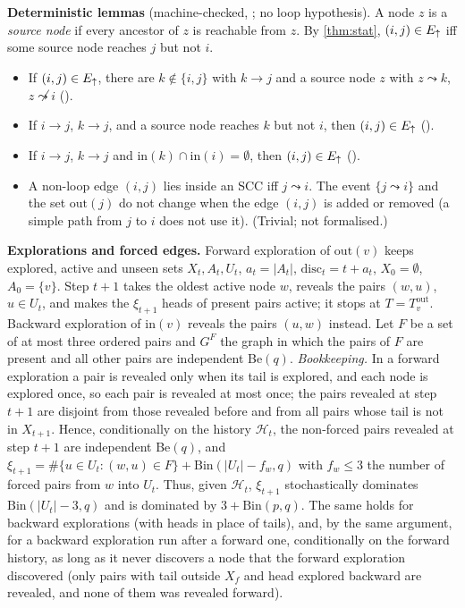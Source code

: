 \textbf{Deterministic lemmas} (machine-checked, ; no loop
hypothesis). A node $z$ is a \emph{source node} if every ancestor of $z$ is
reachable from $z$. By \cref{thm:stat}, $(i,j)\in E_{\uparrow}$ iff some source node
reaches $j$ but not $i$.
\begin{itemize}
\item[(W1)] If $(i,j)\in E_{\uparrow}$, there are $k\notin\{i,j\}$ with $k\to j$ and a
source node $z$ with $z\leadsto k$, $z\not\leadsto i$ ().
\item[(W2)] If $i\to j$, $k\to j$, and a source node reaches $k$ but not $i$,
then $(i,j)\in E_{\uparrow}$ ().
\item[(W3)] If $i\to j$, $k\to j$ and $\mathrm{in}(k)\cap\mathrm{in}(i)=\emptyset$,
then $(i,j)\in E_{\uparrow}$ ().
\item[(W5)] A non-loop edge $(i,j)$ lies inside an SCC iff $j\leadsto i$. The
event $\{j\leadsto i\}$ and the set $\mathrm{out}(j)$ do not change when the
edge $(i,j)$ is added or removed (a simple path from $j$ to $i$ does not use
it). (Trivial; not formalised.)
\end{itemize}

\textbf{Explorations and forced edges.} Forward exploration of $\mathrm{out}(v)$
keeps explored, active and unseen sets $X_t,A_t,U_t$, $a_t=|A_t|$,
$\mathrm{disc}_t=t+a_t$, $X_0=\emptyset$, $A_0=\{v\}$. Step $t+1$ takes the
oldest active node $w$, reveals the pairs $(w,u)$, $u\in U_t$, and makes the
$\xi_{t+1}$ heads of present pairs active; it stops at $T=T^{\mathrm{out}}_v$.
Backward exploration of $\mathrm{in}(v)$ reveals the pairs $(u,w)$ instead.
Let $F$ be a set of at most three ordered pairs and $G^F$ the graph in which the
pairs of $F$ are present and all other pairs are independent Be$(q)$.
\emph{Bookkeeping.} In a forward exploration a pair is revealed only when its
tail is explored, and each node is explored once, so each pair is revealed at
most once; the pairs revealed at step $t+1$ are disjoint from those revealed
before and from all pairs whose tail is not in $X_{t+1}$. Hence, conditionally
on the history $\mathcal H_t$, the non-forced pairs revealed at step $t+1$ are
independent Be$(q)$, and
$\xi_{t+1}=\#\{u\in U_t:(w,u)\in F\}+\mathrm{Bin}(|U_t|-f_w,q)$ with
$f_w\le3$ the number of forced pairs from $w$ into $U_t$. Thus, given
$\mathcal H_t$, $\xi_{t+1}$ stochastically dominates $\mathrm{Bin}(|U_t|-3,q)$
and is dominated by $3+\mathrm{Bin}(p,q)$. The same holds for backward
explorations (with heads in place of tails), and, by the same argument, for a
backward exploration run after a forward one, conditionally on the forward
history, as long as it never discovers a node that the forward exploration
discovered (only pairs with tail outside $X_f$ and head explored backward are
revealed, and none of them was revealed forward).

